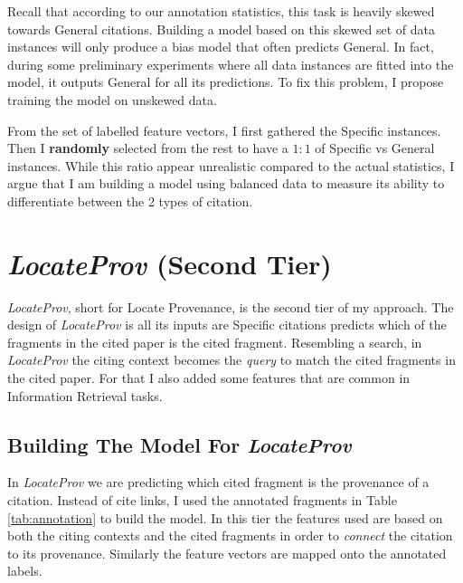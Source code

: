 Recall that according to our annotation statistics, this task is heavily skewed towards General citations. Building a model based on this skewed set of data instances will only produce a bias model that often predicts General. In fact, during some preliminary experiments where all data instances are fitted into the model, it outputs General for all its predictions. To fix this problem, I propose training the model on unskewed data.

From the set of labelled feature vectors, I first gathered the Specific instances. Then I {\bf randomly} selected from the rest to have a $1:1$ of Specific vs General instances. While this ratio appear unrealistic compared to the actual statistics, I argue that I am building a model using balanced data to measure its ability to differentiate between the 2 types of citation.

\section{{\it LocateProv} (Second Tier)}
{\it LocateProv}, short for Locate Provenance, is the second tier of my approach. The design of {\it LocateProv} is all its inputs are Specific citations predicts which of the fragments in the cited paper is the cited fragment. Resembling a search, in {\it LocateProv} the citing context becomes the {\it query} to match the cited fragments in the cited paper. For that I also added some features that are common in Information Retrieval tasks.

\subsection*{Building The Model For {\it LocateProv}}
In {\it LocateProv} we are predicting which cited fragment is the provenance of a citation. Instead of cite links, I used the annotated fragments in Table \ref{tab:annotation} to build the model. In this tier the features used are based on both the citing contexts and the cited fragments in order to {\it connect} the citation to its provenance. Similarly the feature vectors are mapped onto the annotated labels.

